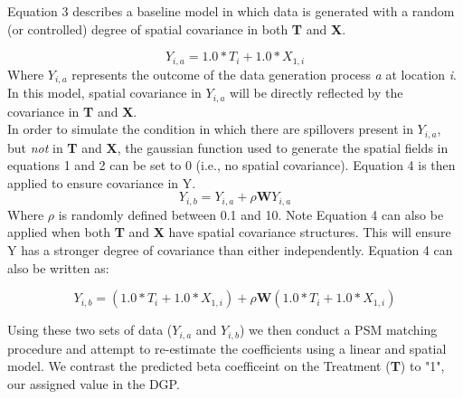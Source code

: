 \documentclass[10pt,a3paper]{report}
\begin{document}
Equation 3 describes a baseline model in which data is generated with a random (or controlled) degree of spatial covariance in both   \textbf{T} and \textbf{X}.

\begin{equation}
Y_{i,a} = 1.0 * T_{i} + 1.0 * X_{1,i}
\end{equation}
Where $Y_{i,a}$ represents the outcome of the data generation process \textit{a} at location \textit{i}.  In this model, spatial covariance in $Y_{i,a}$ will be directly reflected by the covariance in \textbf{T} and \textbf{X}.\\

In order to simulate the condition in which there are spillovers present in $Y_{i,a}$, but \textit{not} in \textbf{T} and \textbf{X}, the gaussian function used to generate the spatial fields in equations 1 and 2 can be set to 0 (i.e., no spatial covariance).  Equation 4 is then applied to ensure covariance in Y.  
\begin{equation}
Y_{i,b} = Y_{i,a} + \rho \boldsymbol {W}Y_{i,a}
\end{equation}
Where $\rho$ is randomly defined between 0.1 and 10.  Note Equation 4 can also be applied when both \textbf{T} and \textbf{X} have spatial covariance structures.  This will ensure Y has a stronger degree of covariance than either independently. Equation 4 can also be written as:

\begin{equation}
Y_{i,b} = (1.0 * T_{i} + 1.0 * X_{1,i}) + \rho \boldsymbol {W}(1.0 * T_{i} + 1.0 * X_{1,i})
\end{equation}

Using these two sets of data ($Y_{i,a}$ and $Y_{i,b}$) we then conduct a PSM matching procedure and attempt to re-estimate the coefficients using a linear and spatial model.  We contrast the predicted beta coefficeint on the Treatment (\textbf{T}) to "1", our assigned value in the DGP.
\end{document}
